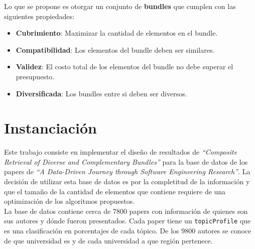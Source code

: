 Lo que se propone es otorgar un conjunto de \textbf{bundles} que cumplen con las siguientes propiedades:
\begin{itemize}
  \item \textbf{Cubrimiento}: Maximizar la cantidad de elementos en el bundle.
  \item \textbf{Compatibilidad}: Los elementos del bundle deben ser similares.
  \item \textbf{Validez}: El costo total de los elementos del bundle no debe superar el presupuesto.
  \item \textbf{Diversificada}: Los bundles entre si deben ser diversos.
\end{itemize}

\section{Instanciación}
Este trabajo consiste en implementar el diseño de resultados de  \textit{\textquotedblleft Composite Retrieval of Diverse and Complementary Bundles\textquotedblright}\cite{compositeRetrival} para la base de datos de los papers de \textit{\textquotedblleft A Data-Driven Journey through Software Engineering Research\textquotedblright}\cite{dataDrive}.
La decisión de utilizar esta base de datos es por la completitud de la información y que el tamaño de la cantidad de elementos
que contiene requiere de una optimización de los algoritmos propuestos.\\

La base de datos contiene cerca de $7800$ papers con información de quienes son sus autores y dónde fueron presentados. 
Cada paper tiene un \texttt{topicProfile} que es una clasificación en porcentajes de cada tópico. De los $9800$ autores se conoce de que universidad es y de cada universidad a que región pertenece.
